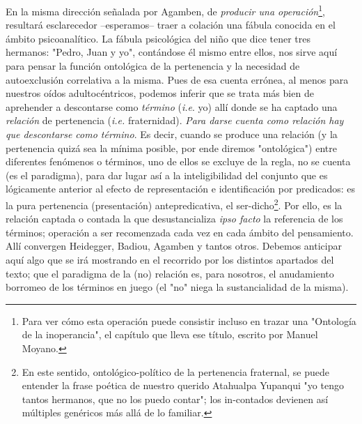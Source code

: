 \documentclass{book}
\begin{document}
En la misma dirección señalada por Agamben, de \emph{producir una
operación}\footnote{Para ver cómo esta operación puede consistir incluso
  en trazar una "Ontología de la inoperancia", el capítulo que lleva ese
  título, escrito por Manuel Moyano.}, resultará esclarecedor
--esperamos-- traer a colación una fábula conocida en el ámbito
psicoanalítico. La fábula psicológica del niño que dice tener tres
hermanos: "Pedro, Juan y yo", contándose él mismo entre ellos, nos sirve
aquí para pensar la función ontológica de la pertenencia y la necesidad
de autoexclusión correlativa a la misma. Pues de esa cuenta errónea, al
menos para nuestros oídos adultocéntricos, podemos inferir que se trata
más bien de aprehender a descontarse como \emph{término} (\emph{i.e}.
yo) allí donde se ha captado una \emph{relación} de pertenencia
(\emph{i.e.} fraternidad). \emph{Para darse cuenta como relación hay que
descontarse como término}. Es decir, cuando se produce una relación (y
la pertenencia quizá sea la mínima posible, por ende diremos
"ontológica") entre diferentes fenómenos o términos, uno de ellos se
excluye de la regla, no se cuenta (es el paradigma), para dar lugar así
a la inteligibilidad del conjunto que es lógicamente anterior al efecto
de representación e identificación por predicados: es la pura
pertenencia (presentación) antepredicativa, el ser-dicho\footnote{En
  este sentido, ontológico-político de la pertenencia fraternal, se
  puede entender la frase poética de nuestro querido Atahualpa Yupanqui
  "yo tengo tantos hermanos, que no los puedo contar"; los in-contados
  devienen así múltiples genéricos más allá de lo familiar.}. Por ello,
es la relación captada o contada la que desustancializa \emph{ipso
facto} la referencia de los términos; operación a ser recomenzada cada
vez en cada ámbito del pensamiento. Allí convergen Heidegger, Badiou,
Agamben y tantos otros. Debemos anticipar aquí algo que se irá mostrando
en el recorrido por los distintos apartados del texto; que el paradigma
de la (no) relación es, para nosotros, el anudamiento borromeo de los
términos en juego (el "no" niega la sustancialidad de la misma).
\end{document}
